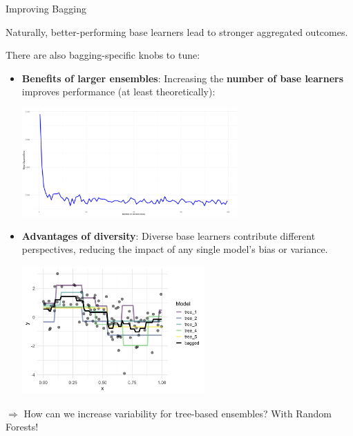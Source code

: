 \documentclass[11pt,compress,t,notes=noshow, xcolor=table]{beamer}
\begin{document}
\begin{vbframe}{Improving Bagging}

Naturally, better-performing base learners lead to stronger aggregated outcomes. \\

\vspace{1em}

There are also bagging-specific knobs to tune:
\begin{itemize}
  \item \textbf{Benefits of larger ensembles}: Increasing the \textbf{number of base learners} improves performance (at least theoretically): %
  \begin{center}
  \includegraphics[width=0.65\textwidth]{figure/bagging-ntree_MSE.png}
  \end{center}
  
  \vspace{2em}

  \item \textbf{Advantages of diversity}: Diverse base learners contribute different perspectives, reducing the impact of any single model's bias or variance.
  \begin{center}
  \includegraphics[width=0.55\textwidth]{figure/bagging-fit.png}
  \end{center}
\end{itemize}

$\Rightarrow$ How can we increase variability for tree-based ensembles? With Random Forests!

\end{vbframe}

\endlecture
\end{document}
